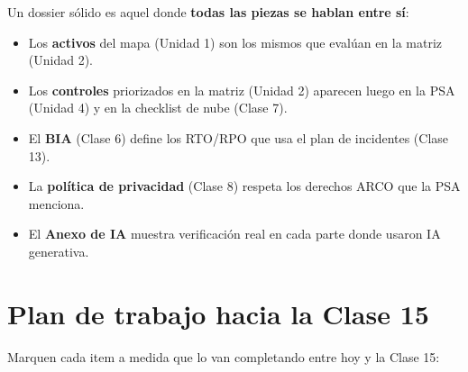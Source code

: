 \documentclass[12pt,a4paper]{article}
\begin{document}
\begin{center}
\end{center}

\begin{cajaNota}[title={La coherencia es la prueba de fuego}]
Un dossier s\'olido es aquel donde \textbf{todas las piezas se hablan entre s\'i}:
\begin{itemize}[leftmargin=2em]
    \item Los \textbf{activos} del mapa (Unidad 1) son los mismos que eval\'uan en la matriz (Unidad 2).
    \item Los \textbf{controles} priorizados en la matriz (Unidad 2) aparecen luego en la PSA (Unidad 4) y en la checklist de nube (Clase 7).
    \item El \textbf{BIA} (Clase 6) define los RTO/RPO que usa el plan de incidentes (Clase 13).
    \item La \textbf{pol\'itica de privacidad} (Clase 8) respeta los derechos ARCO que la PSA menciona.
    \item El \textbf{Anexo de IA} muestra verificaci\'on real en cada parte donde usaron IA generativa.
\end{itemize}
\end{cajaNota}

\newpage
\section{Plan de trabajo hacia la Clase 15}

\begin{cajaCierre}[title={Checklist final antes de la defensa}]
Marquen cada item a medida que lo van completando entre hoy y la Clase 15:
\end{cajaCierre}
\end{document}
